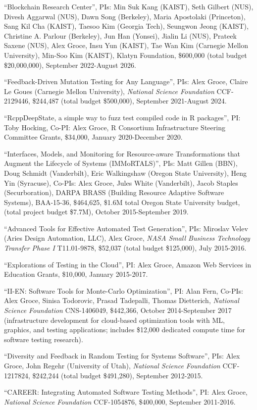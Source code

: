 \documentclass[ComputerScience]{vita}
\begin{document}
\begin{vita}
\begin{Funding}
\item ``Blockchain Research Center'', PIs: Min Suk Kang (KAIST), Seth
  Gilbert (NUS),
  Divesh Aggarwal (NUS), Dawn Song (Berkeley), Maria Apostolaki
  (Princeton), Sang Kil Cha (KAIST), Taesoo
  Kim (Georgia Tech), Seungwon Jeong (KAIST), Christine A. Parlour
  (Berkeley), Jun Han (Yonsei), Jialin Li (NUS),
  Prateek Saxene (NUS), Alex Groce, Insu Yun (KAIST), Tae Wan Kim
  (Carnegie Mellon University), Min-Soo Kim (KAIST),
  Klatyn Foundation, \$600,000 (total budget \$20,000,000), September 2022-August 2026.
\item ``Feedback-Driven Mutation Testing for Any Language'', PIs: Alex Groce, Claire Le Goues (Carnegie Mellon University), \emph{National Science Foundation} CCF-2129446, \$244,487 (total budget \$500,000), September 2021-August 2024.
\item ``{RcppDeepState}, a simple way to fuzz test compiled code in {R} packages'', PI: Toby Hocking, Co-PI: Alex Groce, R Consortium Infrastructure Steering Committee Grants, \$34,000, January 2020-December 2020.
\item ``Interfaces, Models, and Monitoring for Resource-aware Transformations that Augment the Lifecycle of Systems (IMMoRTALS)'', PIs: Matt Gillen (BBN), Doug Schmidt (Vanderbilt), Eric Walkingshaw (Oregon State University), Heng Yin (Syracuse), Co-PIs: Alex Groce, Jules White (Vanderbilt), Jacob Staples (Securboration), DARPA BRASS (Building Resource Adaptive Software Systems), BAA-15-36, \$464,625, \$1.6M total Oregon State University budget, (total project budget \$7.7M), October 2015-September 2019.
\item ``Advanced Tools for Effective Automated Test Generation'', PIs: Miroslav Velev (Aries Design Automation, LLC), Alex Groce, \emph{NASA Small Business Technology Transfer Phase I} T11.01-9878, \$52,037 (total budget \$125,000), July 2015-2016.
\item ``Explorations of Testing in the Cloud'', PI: Alex Groce, Amazon Web Services in Education Grants, \$10,000, January 2015-2017.
\item ``II-EN: Software Tools for Monte-Carlo Optimization'', PI: Alan Fern, Co-PIs: Alex Groce, Sinisa Todorovic, Prasad Tadepalli, Thomas Dietterich, \emph{National Science Foundation} CNS-1406049, \$442,366, October 2014-September 2017 (infrastructure development for cloud-based optimization tools with ML, graphics, and testing applications; includes \$12,000 dedicated compute time for software testing research).
\item ``Diversity and Feedback in Random Testing for Systems Software'', PIs: Alex Groce, John Regehr (University of Utah), \emph{National Science Foundation} CCF-1217824, \$242,244 (total budget \$491,280), September 2012-2015.
\item ``CAREER: Integrating Automated Software Testing Methods'', PI: Alex Groce, \emph{National Science Foundation} CCF-1054876, \$400,000, September 2011-2016.
\end{Funding}


\end{vita}
\end{document}
